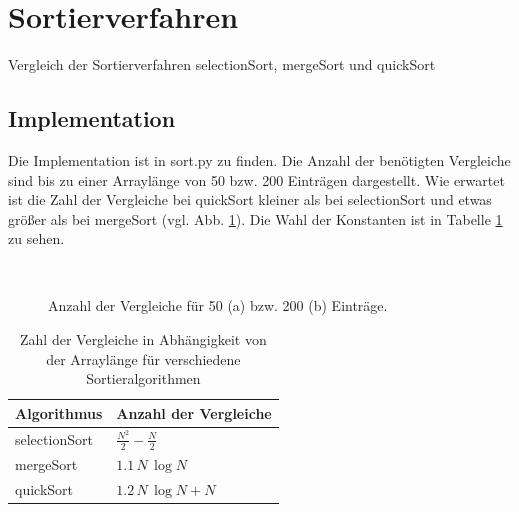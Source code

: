 \documentclass{article}
\begin{document}
\section{Sortierverfahren}

Vergleich der Sortierverfahren selectionSort, mergeSort und quickSort

\subsection{Implementation}
\label{sec:imp}
Die Implementation ist in sort.py zu finden. Die Anzahl der benötigten Vergleiche sind bis zu einer Arraylänge von 50 bzw. 200 Einträgen dargestellt. Wie erwartet ist die Zahl der Vergleiche bei quickSort kleiner als bei selectionSort und etwas größer als bei mergeSort (vgl. Abb. \ref{fig:noc}). Die Wahl der Konstanten ist in Tabelle \ref{tab:func} zu sehen.




\begin{figure}[h!]
\centering
{}
~



\caption{Anzahl der Vergleiche für 50 (a) bzw. 200 (b) Einträge.}
\label{fig:noc}
\end{figure}


\begin{table}[h!]
\centering
\begin{tabular}{|l|l|}
\hline
Algorithmus & Anzahl der Vergleiche \\\hline
selectionSort & $\frac{N^2}{2} -\frac{N}{2}$ \\\hline
mergeSort & $1.1\,N\,\log{N}$ \\\hline
quickSort & $1.2\,N\,\log{N} + N$ \\\hline
\end{tabular}

\caption{Zahl der Vergleiche in Abhängigkeit von der Arraylänge für verschiedene Sortieralgorithmen}
\label{tab:func}
\end{table}
\end{document}
